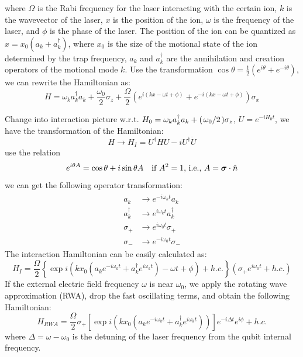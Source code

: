 \documentclass{notes2}
\begin{document}
where $\Omega$ is the Rabi frequency for the laser interacting with the certain ion, $k$ is the wavevector of the laser, $x$ is the position of the ion, $\omega$ is the frequency of the laser, and $\phi$ is the phase of the laser. The position of the ion can be quantized as $x = x_0 (a_k + a_k^\dagger)$, where $x_0$ is the size of the motional state of the ion determined by the trap frequency, $a_k$ and $a_k^\dagger$ are the annihilation and creation operators of the motional mode $k$. Use the transformation $\cos\theta = \frac{1}{2} (e^{i\theta} + e^{-i\theta})$, we can rewrite the Hamiltonian as:
\begin{equation}
    H =  \omega_k a_k^\dagger a_k +  \frac{\omega_0}{2} \sigma_z +  \frac{\Omega}{2} (e^{i(k x - \omega t + \phi)} + e^{-i(k x - \omega t + \phi)})\sigma_x 
\end{equation}

Change into interaction picture w.r.t. $H_0 = \omega_k a_k^\dagger a_k +  (\flatfrac{\omega_0}{2}) \sigma_z$, $U = e^{-i H_0 t}$, we have the transformation of the Hamiltonian:
\begin{equation}
    H \to H_I = U^\dagger H U - i U^\dagger \dot{U}
\end{equation}
use the relation 
\begin{equation}
    e^{i\theta A} = \cos\theta + i \sin\theta A \quad \text{if $A^2 = 1$, i.e., $A = \vb* \sigma \cdot \hat{n}$}
\end{equation}
we can get the following operator transformation:
\begin{align*}
    \begin{split}
    a_k &\to  e^{-i \omega_k t} a_k \\
    a_k^\dagger &\to e^{i \omega_k t} a_k^\dagger \\
    \sigma_+ &\to e^{i \omega_0 t} \sigma_+ \\
    \sigma_- &\to e^{-i \omega_0 t} \sigma_-
    \end{split}
\end{align*}
The interaction Hamiltonian can be easily calculated as:
\begin{equation}
    H_I =  \frac{\Omega}{2} \left\{\exp i \left(k x_0 (a_k e^{-i \omega_k t} + a_k^\dagger e^{i \omega_k t}) - \omega t + \phi\right) + h.c.\right\} (\sigma_+ e^{i \omega_0 t} + h.c.)
\end{equation}
If the external electric field frequency $\omega$ is near $\omega_0$, we apply the rotating wave approximation (RWA), drop the fast oscillating terms, and obtain the following Hamiltonian:
\begin{equation}
    H_{\textit{RWA}} =  \frac{\Omega}{2}\sigma_+ \left[\exp i \left(k x_0 (a_k e^{-i \omega_k t} + a_k^\dagger e^{i \omega_k t})\right)\right]e^{-i\Delta t}e^{i\phi} + h.c.  \tag{Hamiltonian with RWA}
\end{equation}
where $\Delta = \omega - \omega_0$ is the detuning of the laser frequency from the qubit internal frequency.
\end{document}
